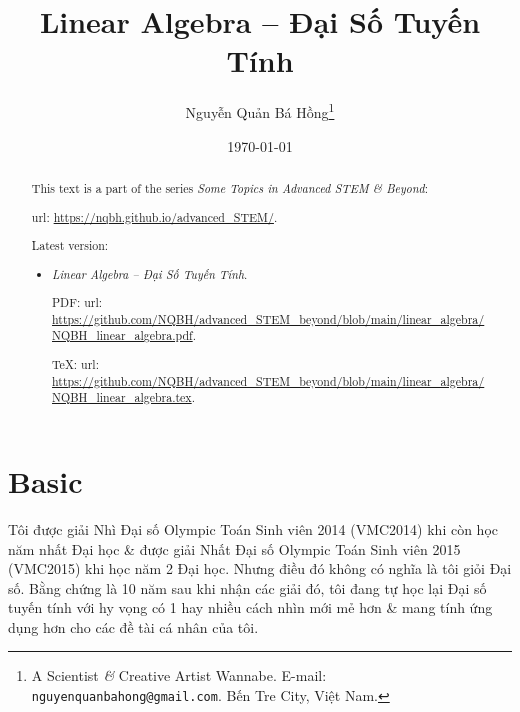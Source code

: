 \documentclass{article}
\title{Linear Algebra -- Đại Số Tuyến Tính}
\author{Nguyễn Quản Bá Hồng\footnote{A Scientist {\it\&} Creative Artist Wannabe. E-mail: {\tt nguyenquanbahong@gmail.com}. Bến Tre City, Việt Nam.}}
\date{\today}
\begin{document}
\maketitle
\begin{abstract}
	This text is a part of the series {\it Some Topics in Advanced STEM \& Beyond}:
	
	{\sc url}: \url{https://nqbh.github.io/advanced_STEM/}.
	
	Latest version:
	\begin{itemize}
		\item {\it Linear Algebra -- Đại Số Tuyến Tính}.
		
		PDF: {\sc url}: \url{https://github.com/NQBH/advanced_STEM_beyond/blob/main/linear_algebra/NQBH_linear_algebra.pdf}.
		
		\TeX: {\sc url}: \url{https://github.com/NQBH/advanced_STEM_beyond/blob/main/linear_algebra/NQBH_linear_algebra.tex}.
	\end{itemize}
\end{abstract}
\tableofcontents


\section{Basic}
Tôi được giải Nhì Đại số Olympic Toán Sinh viên 2014 (VMC2014) khi còn học năm nhất Đại học \& được giải Nhất Đại số Olympic Toán Sinh viên 2015 (VMC2015) khi học năm 2 Đại học. Nhưng điều đó không có nghĩa là tôi giỏi Đại số. Bằng chứng là 10 năm sau khi nhận các giải đó, tôi đang tự học lại Đại số tuyến tính với hy vọng có 1 hay nhiều cách nhìn mới mẻ hơn \& mang tính ứng dụng hơn cho các đề tài cá nhân của tôi.
\end{document}
